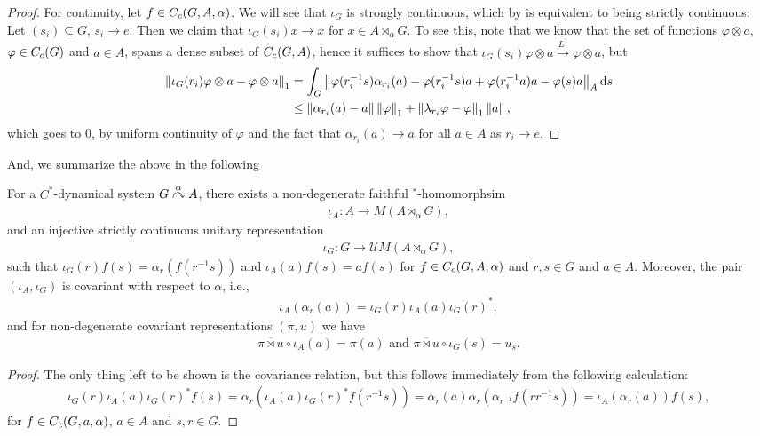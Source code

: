 \begin{proof}
	
	For continuity, let $f \in C_c(G,A,\alpha)$. We will see that $\iota_G$ is strongly continuous, which by  is equivalent to being strictly continuous: Let $(s_i)\subseteq G$, $s_i \to e$. Then we claim that $\iota_G(s_i) x \to x$ for $x \in A \rtimes_\alpha G$. To see this, note that we know that the set of functions $\varphi \otimes a$, $\varphi \in C_c(G)$ and $a \in A$, spans a dense subset of $C_c(G,A)$, hence it suffices to show that $\iota_G(s_i) \varphi \otimes a \stackrel{L^1}{\to} \varphi \otimes a$, but
	\begin{align*}
		\left\lVert \iota_G(r_{i}) \varphi \otimes a - \varphi \otimes a \right\rVert_1 &= \int_G \left\lVert \varphi(r_{i}^{-1}s) \alpha_{r_i}(a) - \varphi(r_i^{-1}s) a + \varphi(r_{i}^{-1}a) a - \varphi(s) a \right\rVert_A \mathrm{d} s\\ 
		& \leq \left\lVert \alpha_{r_i}(a) - a \right\rVert \left\lVert \varphi \right\rVert_1 + \left\lVert \lambda_{r_i} \varphi - \varphi \right\rVert_1 \left\lVert a \right\rVert,
	\end{align*}
	which goes to $0$, by uniform continuity of $\varphi$ and the fact that $\alpha_{r_i}(a) \to a$ for all $ a\in A$ as $r_i \to e$.
\end{proof}
And, we summarize the above in the following
\begin{proposition}
	For a $C^*$-dynamical system $G \stackrel{\alpha}{\curvearrowright} A$, there exists a non-degenerate faithful $^*$-homomorphsim 
	\begin{align*}
	\iota_A \colon A \to M(A \rtimes_\alpha G),	
	\end{align*}
	and an injective strictly continuous unitary representation 
	\begin{align*}
		\iota_G \colon G \to \mathcal{U}M(A \rtimes_\alpha G),
	\end{align*}
	such that $\iota_G(r) f(s) = \alpha_r(f(r^{-1}s))$  and $\iota_A(a) f(s) = af(s)$ for $f \in C_c(G,A,\alpha)$ and $r,s \in G$ and $a \in A$. Moreover, the pair $(\iota_A,\iota_G)$ is covariant with respect to $\alpha$, i.e., 
	\begin{align*}
		\iota_A(\alpha_r (a) ) = \iota_G(r)  \iota_A(a) \iota_G(r)^*,
	\end{align*}
	and for non-degenerate covariant representations $(\pi,u)$ we have
	\begin{align*}
		\overline{\pi \rtimes u} \circ \iota_A(a) = \pi(a) \text{ and } \overline{\pi \rtimes u } \circ \iota_G (s) = u_s.
	\end{align*}
	\label{cross:iotaprop}
\end{proposition}
\begin{proof}
	The only thing left to be shown is the covariance relation, but this follows immediately from the following calculation:
	\begin{align*}
		\iota_G(r) \iota_A(a) \iota_G(r)^* f(s) = \alpha_r(\iota_A(a) \iota_G(r)^{*}f(r^{-1}s)) = \alpha_r(a) \alpha_r ( \alpha_{r^{-1}}f(r r^{-1}s))= \iota_A(\alpha_r(a)) f(s),
	\end{align*}
	for $f \in C_c(G,a,\alpha)$, $a \in A$ and $s,r \in G$.
\end{proof}
